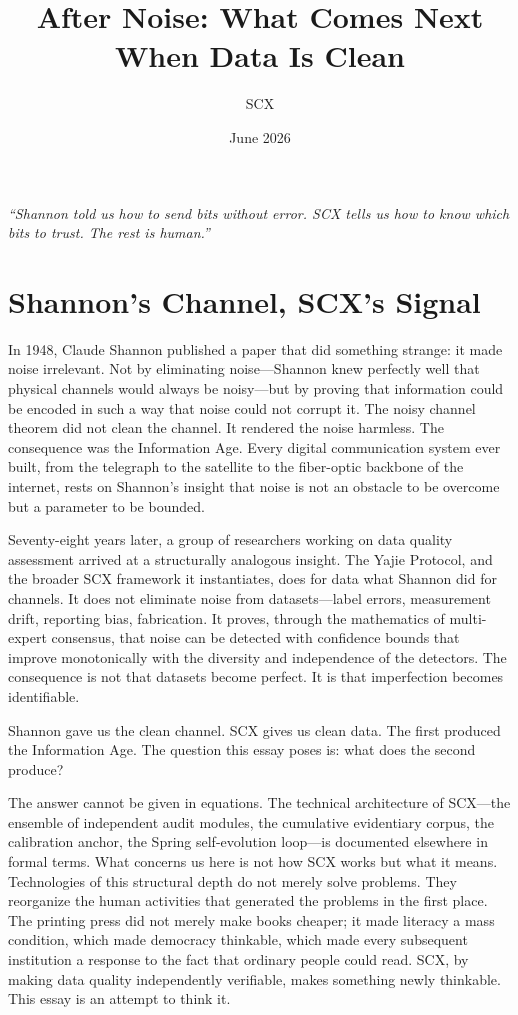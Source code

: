 \documentclass[12pt,a4paper]{article}
\title{After Noise: What Comes Next When Data Is Clean}
\author{SCX}
\date{June 2026}
\begin{document}
\maketitle

\begin{center}
\itshape
``Shannon told us how to send bits without error. SCX tells us how to know which bits to trust. The rest is human.''
\end{center}

\bigskip

\section{Shannon's Channel, SCX's Signal}

In 1948, Claude Shannon published a paper that did something strange: it made noise irrelevant. Not by eliminating noise---Shannon knew perfectly well that physical channels would always be noisy---but by proving that information could be encoded in such a way that noise could not corrupt it. The noisy channel theorem did not clean the channel. It rendered the noise harmless. The consequence was the Information Age. Every digital communication system ever built, from the telegraph to the satellite to the fiber-optic backbone of the internet, rests on Shannon's insight that noise is not an obstacle to be overcome but a parameter to be bounded.

Seventy-eight years later, a group of researchers working on data quality assessment arrived at a structurally analogous insight. The Yajie Protocol, and the broader SCX framework it instantiates, does for data what Shannon did for channels. It does not eliminate noise from datasets---label errors, measurement drift, reporting bias, fabrication. It proves, through the mathematics of multi-expert consensus, that noise can be detected with confidence bounds that improve monotonically with the diversity and independence of the detectors. The consequence is not that datasets become perfect. It is that imperfection becomes identifiable.

Shannon gave us the clean channel. SCX gives us clean data. The first produced the Information Age. The question this essay poses is: what does the second produce?

The answer cannot be given in equations. The technical architecture of SCX---the ensemble of independent audit modules, the cumulative evidentiary corpus, the calibration anchor, the Spring self-evolution loop---is documented elsewhere in formal terms. What concerns us here is not how SCX works but what it means. Technologies of this structural depth do not merely solve problems. They reorganize the human activities that generated the problems in the first place. The printing press did not merely make books cheaper; it made literacy a mass condition, which made democracy thinkable, which made every subsequent institution a response to the fact that ordinary people could read. SCX, by making data quality independently verifiable, makes something newly thinkable. This essay is an attempt to think it.
\end{document}
